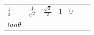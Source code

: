 {{\begin{center}
\begin{xtabular}[t]{|l|l|l|l|l|l|l|}
    
        
                \begin{math}\frac{1}{2}\end{math}
               &
    
    
        
                \begin{math}\frac{1}{\sqrt{2}}\end{math}
               &
    
    
        
                \begin{math}\frac{\sqrt{3}}{2}\end{math}
               &
    
    
        1 &
    
    
        0%
     \tabularnewline{}
    
    
        
                \begin{math}tan\theta \end{math}
               &
    

\end{xtabular}
\end{center}}}
